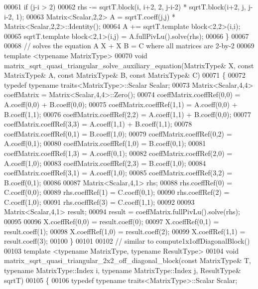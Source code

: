 \begin{DoxyCode}
00061   \textcolor{keywordflow}{if} (j-i > 2)
00062     rhs -= sqrtT.block(i, i+2, 2, j-i-2) * sqrtT.block(i+2, j, j-i-2, 1);
00063   Matrix<Scalar,2,2> A = sqrtT.coeff(j,j) * Matrix<Scalar,2,2>::Identity();
00064   A += sqrtT.template block<2,2>(i,i);
00065   sqrtT.template block<2,1>(i,j) = A.fullPivLu().solve(rhs);
00066 \}
00067 
00068 \textcolor{comment}{// solves the equation A X + X B = C where all matrices are 2-by-2}
00069 \textcolor{keyword}{template} <\textcolor{keyword}{typename} MatrixType>
00070 \textcolor{keywordtype}{void} matrix\_sqrt\_quasi\_triangular\_solve\_auxiliary\_equation(MatrixType& X, \textcolor{keyword}{const} MatrixType& A, \textcolor{keyword}{const} 
      MatrixType& B, \textcolor{keyword}{const} MatrixType& C)
00071 \{
00072   \textcolor{keyword}{typedef} \textcolor{keyword}{typename} traits<MatrixType>::Scalar Scalar;
00073   Matrix<Scalar,4,4> coeffMatrix = Matrix<Scalar,4,4>::Zero();
00074   coeffMatrix.coeffRef(0,0) = A.coeff(0,0) + B.coeff(0,0);
00075   coeffMatrix.coeffRef(1,1) = A.coeff(0,0) + B.coeff(1,1);
00076   coeffMatrix.coeffRef(2,2) = A.coeff(1,1) + B.coeff(0,0);
00077   coeffMatrix.coeffRef(3,3) = A.coeff(1,1) + B.coeff(1,1);
00078   coeffMatrix.coeffRef(0,1) = B.coeff(1,0);
00079   coeffMatrix.coeffRef(0,2) = A.coeff(0,1);
00080   coeffMatrix.coeffRef(1,0) = B.coeff(0,1);
00081   coeffMatrix.coeffRef(1,3) = A.coeff(0,1);
00082   coeffMatrix.coeffRef(2,0) = A.coeff(1,0);
00083   coeffMatrix.coeffRef(2,3) = B.coeff(1,0);
00084   coeffMatrix.coeffRef(3,1) = A.coeff(1,0);
00085   coeffMatrix.coeffRef(3,2) = B.coeff(0,1);
00086 
00087   Matrix<Scalar,4,1> rhs;
00088   rhs.coeffRef(0) = C.coeff(0,0);
00089   rhs.coeffRef(1) = C.coeff(0,1);
00090   rhs.coeffRef(2) = C.coeff(1,0);
00091   rhs.coeffRef(3) = C.coeff(1,1);
00092 
00093   Matrix<Scalar,4,1> result;
00094   result = coeffMatrix.fullPivLu().solve(rhs);
00095 
00096   X.coeffRef(0,0) = result.coeff(0);
00097   X.coeffRef(0,1) = result.coeff(1);
00098   X.coeffRef(1,0) = result.coeff(2);
00099   X.coeffRef(1,1) = result.coeff(3);
00100 \}
00101 
00102 \textcolor{comment}{// similar to compute1x1offDiagonalBlock()}
00103 \textcolor{keyword}{template} <\textcolor{keyword}{typename} MatrixType, \textcolor{keyword}{typename} ResultType>
00104 \textcolor{keywordtype}{void} matrix\_sqrt\_quasi\_triangular\_2x2\_off\_diagonal\_block(\textcolor{keyword}{const} MatrixType& T, \textcolor{keyword}{typename} MatrixType::Index i,
       \textcolor{keyword}{typename} MatrixType::Index j, ResultType& sqrtT)
00105 \{
00106   \textcolor{keyword}{typedef} \textcolor{keyword}{typename} traits<MatrixType>::Scalar Scalar;

\end{DoxyCode}
